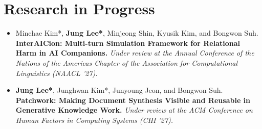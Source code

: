 \documentclass[letterpaper,10pt]{article}
\let\oldsection\section
\renewcommand{\section}[1]{\needspace{8\baselineskip}\oldsection{#1}}
\newenvironment{plain}
  {\begin{itemize}[leftmargin=1.2em, itemsep=\PLAINSEP, parsep=0pt, topsep=\TOPSEP]}
  {\end{itemize}}
\begin{document}
\section{Research in Progress}
\begin{plain}

  \item Minchae Kim*, \textbf{Jung Lee*}, Minjeong Shin, Kyusik Kim, and Bongwon Suh.
        \textbf{InterAICion: Multi-turn Simulation Framework for Relational Harm in AI Companions.}
        \textit{Under review at the Annual Conference of the Nations of the Americas Chapter of the Association for Computational Linguistics (NAACL '27).}

    \item \textbf{Jung Lee*}, Junghwan Kim*, Junyoung Jeon, and Bongwon Suh.
        \textbf{Patchwork: Making Document Synthesis Visible and Reusable in Generative Knowledge Work.}
        \textit{Under review at the ACM Conference on Human Factors in Computing Systems (CHI '27).}
\end{plain}
\end{document}
